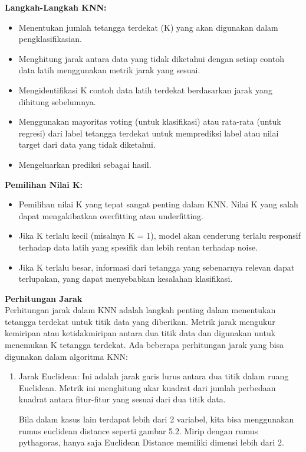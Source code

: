 \documentclass[
  letterpaper,
  DIV=11,
  numbers=noendperiod]{scrreprt}
\providecommand{\tightlist}{%
  \setlength{\itemsep}{0pt}\setlength{\parskip}{0pt}}\usepackage{longtable,booktabs,array}
\begin{document}
\textbf{Langkah-Langkah KNN:}

\begin{itemize}
\tightlist
\item
  Menentukan jumlah tetangga terdekat (K) yang akan digunakan dalam
  pengklasifikasian.\\
\item
  Menghitung jarak antara data yang tidak diketahui dengan setiap contoh
  data latih menggunakan metrik jarak yang sesuai.\\
\item
  Mengidentifikasi K contoh data latih terdekat berdasarkan jarak yang
  dihitung sebelumnya.\\
\item
  Menggunakan mayoritas voting (untuk klasifikasi) atau rata-rata (untuk
  regresi) dari label tetangga terdekat untuk memprediksi label atau
  nilai target dari data yang tidak diketahui.\\
\item
  Mengeluarkan prediksi sebagai hasil.
\end{itemize}

\textbf{Pemilihan Nilai K:}

\begin{itemize}
\tightlist
\item
  Pemilihan nilai K yang tepat sangat penting dalam KNN. Nilai K yang
  salah dapat mengakibatkan overfitting atau underfitting.\\
\item
  Jika K terlalu kecil (misalnya K = 1), model akan cenderung terlalu
  responsif terhadap data latih yang spesifik dan lebih rentan terhadap
  noise.\\
\item
  Jika K terlalu besar, informasi dari tetangga yang sebenarnya relevan
  dapat terlupakan, yang dapat menyebabkan kesalahan klasifikasi.
\end{itemize}

\textbf{Perhitungan Jarak}\\
Perhitungan jarak dalam KNN adalah langkah penting dalam menentukan
tetangga terdekat untuk titik data yang diberikan. Metrik jarak mengukur
kemiripan atau ketidakmiripan antara dua titik data dan digunakan untuk
menemukan K tetangga terdekat. Ada beberapa perhitungan jarak yang bisa
digunakan dalam algoritma KNN:

\begin{enumerate}
\def\labelenumi{\alph{enumi})}
\item
  Jarak Euclidean: Ini adalah jarak garis lurus antara dua titik dalam
  ruang Euclidean. Metrik ini menghitung akar kuadrat dari jumlah
  perbedaan kuadrat antara fitur-fitur yang sesuai dari dua titik data.

  Bila dalam kasus lain terdapat lebih dari 2 variabel, kita bisa
  menggunakan rumus euclidean distance seperti gambar 5.2. Mirip dengan
  rumus pythagoras, hanya saja Euclidean Distance memiliki dimensi lebih
  dari 2.
\end{enumerate}
\end{document}
